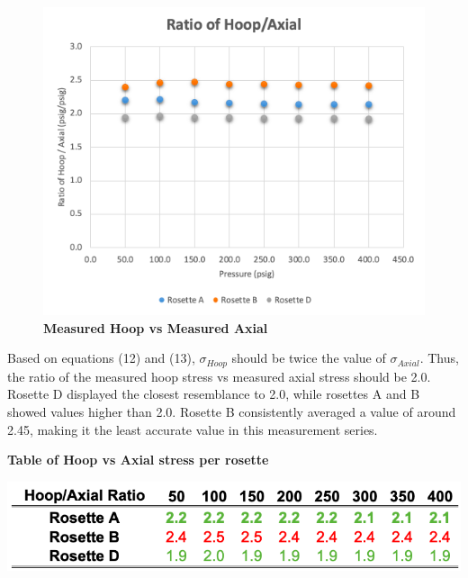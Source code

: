 \documentclass[12pt]{article}
\begin{document}
\begin{figure} [H]
	\centering
	\includegraphics [width=1.0\textwidth]{plot_hoop_vs_axial}
	\caption{ \textbf{Measured Hoop vs Measured Axial}}
\end{figure} 
Based on equations (12) and (13), $ \sigma_{Hoop} $ should be twice the value of $\sigma_{Axial}$. 
Thus, the ratio of the measured hoop stress vs measured axial stress should be 2.0. Rosette D displayed the closest resemblance to 2.0, while rosettes A and B showed values higher than 2.0.
Rosette B consistently averaged a value of around 2.45, making it the least accurate value
in this measurement series. 

\begin{table}[H]
  \caption{\textbf{Table of Hoop vs Axial stress per rosette}}
  \includegraphics[width=\linewidth]{table_hoop_axial}
  \centering
\end{table}
\end{document}
